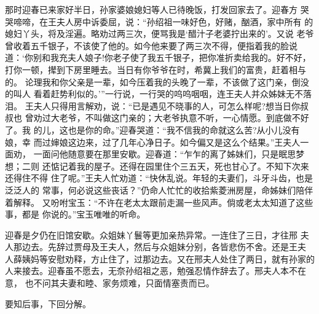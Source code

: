 那时迎春已来家好半日，孙家婆娘媳妇等人已待晚饭，打发回家去了。迎春方
哭哭啼啼，在王夫人房中诉委屈，说：“孙绍祖一味好色，好赌，酗酒，家中所有
的媳妇丫头，将及淫遍。略劝过两三次，便骂我是‘醋汁子老婆拧出来的’。又说
老爷曾收着五千银子，不该使了他的。如今他来要了两三次不得，便指着我的脸说
道：‘你别和我充夫人娘子!你老子使了我五千银子，把你准折卖给我的。好不好，
打你一顿，撵到下房里睡去。当日有你爷爷在时，希冀上我们的富贵，赶着相与的。
论理我和你父亲是一辈，如今压着我的头晚了一辈，不该做了这门亲，倒没的叫人
看着赶势利似的。’”一行说，一行哭的呜呜咽咽，连王夫人并众姊妹无不落泪。
王夫人只得用言解劝，说：“已是遇见不晓事的人，可怎么样呢?想当日你叔叔也
曾劝过大老爷，不叫做这门亲的；大老爷执意不听，一心情愿。到底做不好了。我
的儿，这也是你的命。”迎春哭道：“我不信我的命就这么苦?从小儿没有娘，幸
而过婶娘这边来，过了几年心净日子。如今偏又是这么个结果。”王夫人一面劝，
一面问他随意要在那里安歇。迎春道：“乍乍的离了姊妹们，只是眠思梦想；二则
还惦记着我的屋子。还得在园里住个三五天，死也甘心了。不知下次来还得住不得
住了呢。”王夫人忙劝道：“快休乱说。年轻的夫妻们，斗牙斗齿，也是泛泛人的
常事，何必说这些丧话？”仍命人忙忙的收拾紫菱洲房屋，命姊妹们陪伴着解释。
又吩咐宝玉：“不许在老太太跟前走漏一些风声。倘或老太太知道了这些事，都是
你说的。”宝玉唯唯的听命。

迎春是夕仍在旧馆安歇。众姐妹丫鬟等更加亲热异常。一连住了三日，才往邢
夫人那边去。先辞过贾母及王夫人，然后与众姐妹分别，各皆悲伤不舍。还是王夫
人薛姨妈等安慰劝释，方止住了，过那边去。又在邢夫人处住了两日，就有孙家的
人来接去。迎春虽不愿去，无奈孙绍祖之恶，勉强忍情作辞去了。邢夫人本不在意，
也不问其夫妻和睦、家务烦难，只面情塞责而已。

要知后事，下回分解。